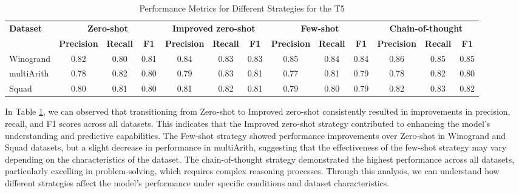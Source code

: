 \documentclass[fleqn,moreauthors,10pt]{ds_report}
\begin{document}


\begin{table}[!htbp]
\centering

\begin{adjustbox}{width=\columnwidth}
\begin{tabular}{@{}lcccccccccccc@{}}
\toprule
\textbf{Dataset} & \multicolumn{3}{c}{\textbf{Zero-shot}} & \multicolumn{3}{c}{\textbf{Improved zero-shot}} & \multicolumn{3}{c}{\textbf{Few-shot}} & \multicolumn{3}{c}{\textbf{Chain-of-thought}} \\
 & \textbf{Precision} & \textbf{Recall} & \textbf{F1} & \textbf{Precision} & \textbf{Recall} & \textbf{F1} & \textbf{Precision} & \textbf{Recall} & \textbf{F1} & \textbf{Precision} & \textbf{Recall} & \textbf{F1} \\ \midrule
 Winogrand & 0.82 & 0.80 & 0.81 & 0.84 & 0.83 & 0.83 & 0.85 & 0.84 & 0.84 & 0.86 & 0.85 & 0.85 \\
 multiArith & 0.78 &  0.82 & 0.80 & 0.79 & 0.83 & 0.81 & 0.77 & 0.81 & 0.79 & 0.78 & 0.82 & 0.80 \\ 
 Squad & 0.80 &  0.81 & 0.80 & 0.81 & 0.82 & 0.81 & 0.79 & 0.80 & 0.79 & 0.82 & 0.83 & 0.82 \\ \bottomrule
\end{tabular}
\end{adjustbox}
\caption{Performance Metrics for Different Strategies for the T5}
\label{tab:performance_metrics_T5}
\end{table}

In Table \ref{tab:performance_metrics_T5}, we can observed that transitioning from Zero-shot to Improved zero-shot consistently resulted in improvements in precision, recall, and F1 scores across all datasets. This indicates that the Improved zero-shot strategy contributed to enhancing the model's understanding and predictive capabilities. The Few-shot strategy showed performance improvements over Zero-shot in Winogrand and Squad datasets, but a slight decrease in performance in multiArith, suggesting that the effectiveness of the few-shot strategy may vary depending on the characteristics of the dataset. The chain-of-thought strategy demonstrated the highest performance across all datasets, particularly excelling in problem-solving, which requires complex reasoning processes. Through this analysis, we can understand how different strategies affect the model's performance under specific conditions and dataset characteristics.
\end{document}
